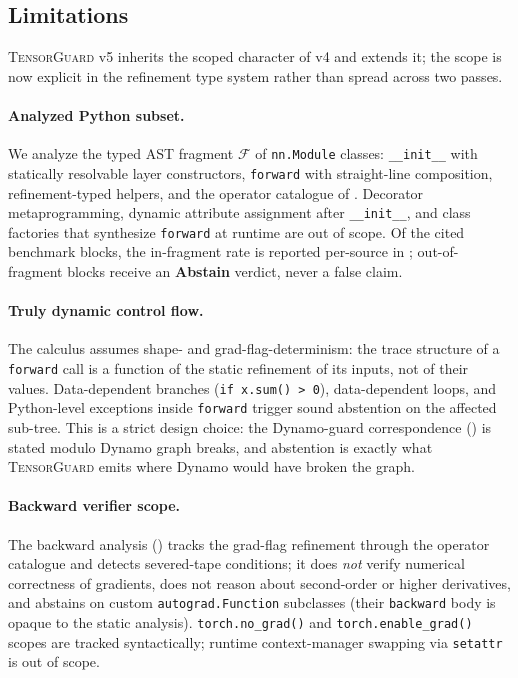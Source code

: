 \subsection{Limitations}\label{sec:limitations}

\textsc{TensorGuard} v5 inherits the scoped character of v4 and
extends it; the scope is now explicit in the refinement type
system rather than spread across two passes.

\paragraph{Analyzed Python subset.} We analyze the typed AST
fragment $\mathcal F$ of \verb|nn.Module| classes:
\verb|__init__| with statically resolvable layer constructors,
\verb|forward| with straight-line composition, refinement-typed
helpers, and the operator catalogue of
. Decorator metaprogramming, dynamic
attribute assignment after \verb|__init__|, and class factories
that synthesize \verb|forward| at runtime are out of scope. Of
the cited benchmark blocks, the in-fragment rate is reported
per-source in ; out-of-fragment blocks receive an
\textbf{Abstain} verdict, never a false claim.

\paragraph{Truly dynamic control flow.} The calculus assumes
shape- and grad-flag-determinism: the trace structure of a
\verb|forward| call is a function of the static refinement of its
inputs, not of their values. Data-dependent branches
(\verb|if x.sum() > 0|), data-dependent loops, and Python-level
exceptions inside \verb|forward| trigger sound abstention on the
affected sub-tree. This is a strict design choice: the
Dynamo-guard correspondence () is stated
modulo Dynamo graph breaks, and abstention is exactly what
\textsc{TensorGuard} emits where Dynamo would have broken the
graph.

\paragraph{Backward verifier scope.} The backward analysis
() tracks the grad-flag refinement
through the operator catalogue and detects severed-tape
conditions; it does \emph{not} verify numerical correctness of
gradients, does not reason about second-order or higher
derivatives, and abstains on custom \verb|autograd.Function|
subclasses (their \verb|backward| body is opaque to the static
analysis). \verb|torch.no_grad()| and \verb|torch.enable_grad()|
scopes are tracked syntactically; runtime context-manager
swapping via \verb|setattr| is out of scope.

